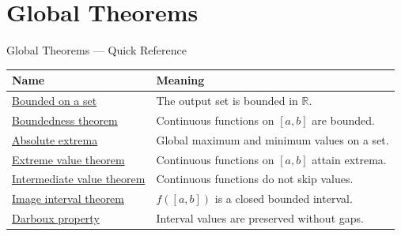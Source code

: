 
\section{Global Theorems}

\begin{toolkitbox}{Global Theorems --- Quick Reference}
\small
\begin{tabular}{l l}
\toprule
\textbf{Name} & \textbf{Meaning}\\
\midrule
\hyperref[def:bounded-on-a-set]{Bounded on a set} & The output set is bounded in $\mathbb{R}$.\\
\hyperref[thm:boundedness-theorem]{Boundedness theorem} & Continuous functions on $[a,b]$ are bounded.\\
\hyperref[def:absolute-extrema]{Absolute extrema} & Global maximum and minimum values on a set.\\
\hyperref[thm:extreme-value-theorem]{Extreme value theorem} & Continuous functions on $[a,b]$ attain extrema.\\
\hyperref[thm:bolzano-intermediate-value]{Intermediate value theorem} & Continuous functions do not skip values.\\
\hyperref[thm:image-of-closed-bounded-interval]{Image interval theorem} & $f([a,b])$ is a closed bounded interval.\\
\hyperref[thm:darboux-property]{Darboux property} & Interval values are preserved without gaps.\\
\bottomrule
\end{tabular}
\end{toolkitbox}



